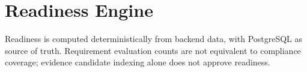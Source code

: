 \section{Readiness Engine}
Readiness is computed deterministically from backend data, with PostgreSQL as source of truth. Requirement evaluation counts are not equivalent to compliance coverage; evidence candidate indexing alone does not approve readiness.

